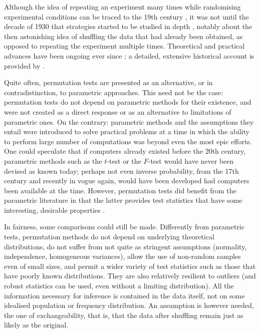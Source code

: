 Although the idea of repeating an experiment many times while randomising experimental conditions can be traced to the 19th century \citep{Peirce1884}, it was not until the decade of 1930 that strategies started to be studied in depth \citep{Fisher1935, Pitman1937-I, Pitman1937-II, Pitman1938}, notably about the then astonishing idea of shuffling the data that had already been obtained, as opposed to repeating the experiment multiple times. Theoretical and practical advances have been ongoing ever since \citep{Pearson1937, Scheffe1943, Lehmann1949, Kempthorne1955, Freedman1983, Westfall1993, Edgington1995, Good2002, Good2005, Westfall2008, Pesarin2010}; a detailed, extensive historical account is provided by \citet{Berry2014}.

Quite often, permutation tests are presented as an alternative, or in contradistinction, to parametric approaches. This need not be the case: permutation tests do not depend on parametric methods for their existence, and were not created as a direct response or as an alternative to limitations of parametric ones. On the contrary: parametric methods and the assumptions they entail were introduced to solve practical problems at a time in which the ability to perform large number of computations was beyond even the most epic efforts. One could speculate that if computers already existed before the 20th century, parametric methods such as the $t$-test or the $F$-test would have never been devised as known today; perhaps not even inverse probability, from the 17th century and recently in vogue again, would have been developed had computers been available at the time. However, permutation tests did benefit from the parametric literature in that the latter provides test statistics that have some interesting, desirable properties \citep{Hall1991}.

In fairness, some comparisons could still be made. Differently from parametric tests, permutation methods do not depend on underlying theoretical distributions, do not suffer from not quite as stringent assumptions (normality, independence, homogeneous variances), allow the use of non-random samples even of small sizes, and permit a wider variety of test statistics such as those that have poorly known distributions. They are also relatively resilient to outliers (and robust statistics can be used, even without a limiting distribution). All the information necessary for inference is contained in the data itself, not on some idealised population or frequency distribution. An assumption is however needed, the one of exchangeability, that is, that the data after shuffling remain just as likely as the original.

